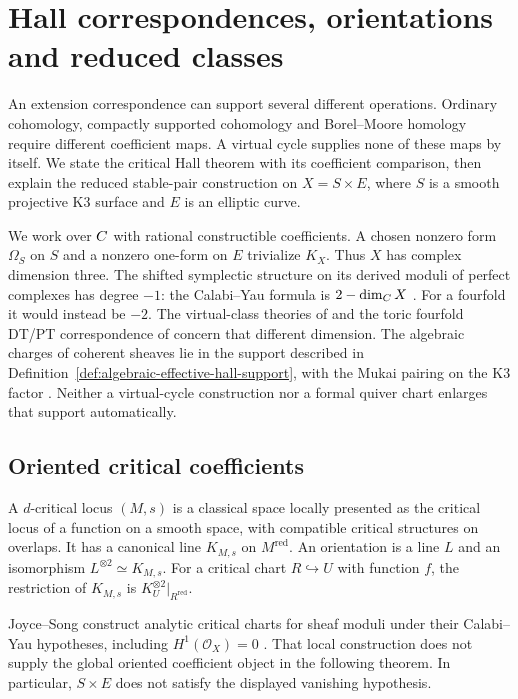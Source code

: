 \section{Hall correspondences, orientations and reduced classes}
\label{app:hall-correspondences}

An extension correspondence can support several different operations.
Ordinary cohomology, compactly supported cohomology and Borel--Moore
homology require different coefficient maps. A virtual cycle supplies
none of these maps by itself. We state the critical Hall theorem with
its coefficient comparison, then explain the reduced stable-pair
construction on $X=S\times E$, where $S$ is a smooth projective K3
surface and $E$ is an elliptic curve.

We work over $C$ with rational constructible coefficients. A chosen
nonzero form $\Omega_S$ on $S$ and a nonzero one-form on $E$ trivialize
$K_X$. Thus $X$ has complex dimension three. The shifted symplectic
structure on its derived moduli of perfect complexes has degree $-1$:
the Calabi--Yau formula is $2-\dim_{C} X$ \cite{PTVV2013}.
For a fourfold it would instead be $-2$. The virtual-class theories
of \cite{BorisovJoyce,OhThomasI,OhThomasII} and the toric
fourfold DT/PT correspondence of \cite{CaoKoolMonavari} concern
that different dimension. The algebraic
charges of coherent sheaves lie in the support described in
Definition~\ref{def:algebraic-effective-hall-support}, with the
Mukai pairing on the K3 factor \cite{Mukai1984}. Neither a
virtual-cycle construction nor a formal quiver chart enlarges that
support automatically.

\subsection{Oriented critical coefficients}
\label{app:bbdjs}

A $d$-critical locus $(M,s)$ is a classical space locally presented as
the critical locus of a function on a smooth space, with compatible
critical structures on overlaps. It has a canonical line $K_{M,s}$
on $M^{\mathrm{red}}$. An orientation is a line $L$ and an isomorphism
$L^{\otimes2}\simeq K_{M,s}$. For a critical chart
$R\hookrightarrow U$ with function $f$, the restriction of $K_{M,s}$
is $K_U^{\otimes2}|_{R^{\mathrm{red}}}$.

Joyce--Song construct analytic critical charts for sheaf moduli
under their Calabi--Yau hypotheses, including
$H^1(\mathcal O_X)=0$ \cite[Theorems~5.4--5.5]{JoyceSong}.
That local construction does not supply the global oriented
coefficient object in the following theorem. In particular,
$S\times E$ does not satisfy the displayed vanishing hypothesis.

